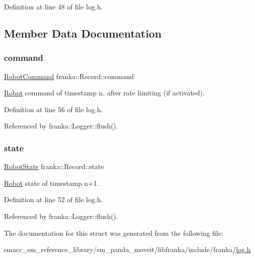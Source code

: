 Definition at line 48 of file log.\+h.



\subsection{Member Data Documentation}
\mbox{\label{structfranka_1_1Record_a8106f2ba9c2cf5ec7cbcf914c4c99e9c}} 
\subsubsection{\texorpdfstring{command}{command}}
{\footnotesize\ttfamily \hyperlink{structfranka_1_1RobotCommand}{Robot\+Command} franka\+::\+Record\+::command}

\hyperlink{classfranka_1_1Robot}{Robot} command of timestamp n, after rate limiting (if activated). 

Definition at line 56 of file log.\+h.



Referenced by franka\+::\+Logger\+::flush().

\mbox{\label{structfranka_1_1Record_a58249658c9549fbc792eea90e7b6a7cc}} 
\subsubsection{\texorpdfstring{state}{state}}
{\footnotesize\ttfamily \hyperlink{structfranka_1_1RobotState}{Robot\+State} franka\+::\+Record\+::state}

\hyperlink{classfranka_1_1Robot}{Robot} state of timestamp n+1. 

Definition at line 52 of file log.\+h.



Referenced by franka\+::\+Logger\+::flush().



The documentation for this struct was generated from the following file\+:\begin{DoxyCompactItemize}
\item 
smacc\+\_\+sm\+\_\+reference\+\_\+library/sm\+\_\+panda\+\_\+moveit/libfranka/include/franka/\hyperlink{log_8h}{log.\+h}\end{DoxyCompactItemize}

